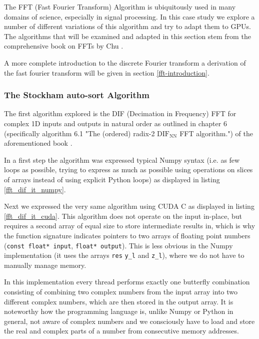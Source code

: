 \documentclass[english,11pt,a4paper,table]{article} %
\begin{document}
The FFT (Fast Fourier Transform) Algorithm is ubiquitously used in many domains of science, especially in signal processing.
In this case study we explore a number of different variations of this algorithm and try to adapt them to GPUs.
The algorithms that will be examined and adapted in this section stem from the comprehensive book on FFTs by Chu \cite{ChuEleanor2000ItFb}.

A more complete introduction to the discrete Fourier transform a derivation of the fast fourier transform will be given in section \ref{fft-introduction}.

\subsubsection{The Stockham auto-sort Algorithm}


The first algorithm explored is the DIF (Decimation in Frequency) FFT for complex 1D inputs and outputs in natural order as outlined in chapter 6 (specifically algorithm 6.1 "The (ordered) radix-2 $\text{DIF}_{\text{NN}}$ FFT algorithm.") of the aforementioned book \cite{ChuEleanor2000ItFb}.

In a first step the algorithm was expressed typical Numpy syntax (i.e. as few loops as possible, trying to express as much as possible using operations on slices of arrays instead of using explicit Python loops) as displayed in listing \ref*{fft_dif_it_numpy}.


Next we expressed the very same algorithm using CUDA C as displayed in listing \ref{fft_dif_it_cuda}.
This algorithm does not operate on the input in-place, but requires a second array of equal size to store intermediate results in, which is why the function signature indicates pointers to two arrays of floating point numbers (\texttt{const float* input}, \texttt{float* output}).
This is less obvious in the Numpy implementation (it uses the arrays \texttt{res} \texttt{y\_l} and \texttt{z\_l}), where we do not have to manually manage memory.

In this implementation every thread performs exactly one butterfly combination consisting of combining two complex numbers from the input array into two different complex numbers, which are then stored in the output array.
It is noteworthy how the programming language is, unlike Numpy or Python in general, not aware of complex numbers and we consciously have to load and store the real and complex parts of a number from consecutive memory addresses.
\end{document}
